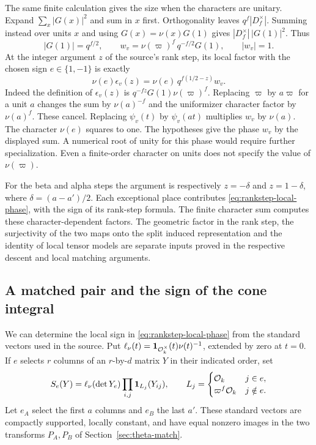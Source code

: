 The same finite calculation gives the size when the characters are
unitary. Expand \(\sum_x|G(x)|^2\) and sum in \(x\) first.
Orthogonality leaves \(q^f|D_f^\times|\). Summing instead over
units \(x\) and using \(G(x)=\nu(x)G(1)\) gives
\(|D_f^\times|\,|G(1)|^2\). Thus
\[
 |G(1)|=q^{f/2},\qquad
 w_v=\nu(\varpi)^f\,q^{-f/2}G(1),\qquad |w_v|=1 .
\]
At the integer argument \(z\) of the source's rank step, its local
factor with the chosen sign \(e\in\{1,-1\}\) is exactly
\begin{equation}
 \nu(e)\epsilon_v(z)=\nu(e)\,q^{f(1/2-z)}w_v .
 \label{eq:rankstep-local-phase}
\end{equation}
Indeed the definition of \(\epsilon_v(z)\) is
\(q^{-fz}G(1)\nu(\varpi)^f\). Replacing \(\varpi\) by \(a\varpi\)
for a unit \(a\) changes the sum by \(\nu(a)^{-f}\) and the
uniformizer character factor by \(\nu(a)^f\). These cancel.
Replacing \(\psi_v(t)\) by \(\psi_v(at)\) multiplies \(w_v\) by
\(\nu(a)\). The character \(\nu(e)\) squares to one.
The hypotheses give the phase \(w_v\) by the displayed sum. A
numerical root of unity for this phase would require further
specialization. Even a finite-order character on units does not
specify the value of \(\nu(\varpi)\).

For the beta and alpha steps the argument is respectively
\(z=-\delta\) and \(z=1-\delta\), where
\(\delta=(a-a')/2\). Each exceptional place contributes
\eqref{eq:rankstep-local-phase}, with the sign of its rank-step
formula. The finite character sum computes these character-dependent
factors. The geometric factor in the rank step, the surjectivity
of the two maps onto the split induced representation and the
identity of local tensor models are separate inputs proved in the
respective descent and local matching arguments.

\subsection{A matched pair and the sign of the cone integral}

We can determine the local sign in \eqref{eq:rankstep-local-phase}
from the standard vectors used in the source. Put
\(\ell_\nu(t)={\bf1}_{\mathcal O_k^\times}(t)\nu(t)^{-1}\), extended
by zero at \(t=0\). If \(e\) selects \(r\) columns of an \(r\)-by-\(d\)
matrix \(Y\) in their indicated order, set
\[
  S_e(Y)=\ell_\nu(\det Y_e)
  \prod_{i,j}{\bf1}_{L_j}(Y_{ij}),\qquad
  L_j=\begin{cases}
       \mathcal O_k&j\in e,\\
       \varpi^f\mathcal O_k&j\notin e .
       \end{cases}
\]
Let \(e_A\) select the first \(a\) columns and \(e_B\) the last \(a'\).
These standard vectors are compactly supported, locally constant,
and have equal nonzero images in the two transforms \(P_A,P_B\)
of Section~\ref{sec:theta-match}.


